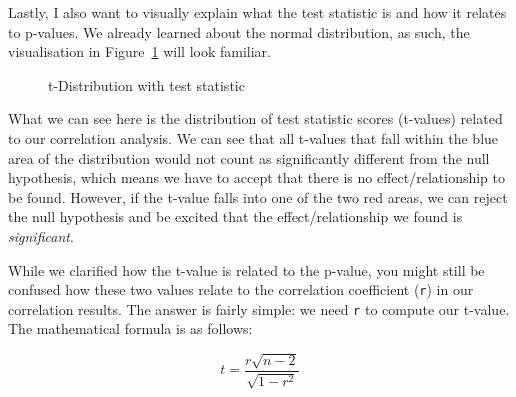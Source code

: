 \documentclass[
  letterpaper,
  DIV=11,
  numbers=noendperiod]{scrreprt}
\begin{document}
Lastly, I also want to visually explain what the test statistic is and
how it relates to p-values. We already learned about the normal
distribution, as such, the visualisation in
Figure~\ref{fig-null-hypothesis-testing-plot} will look familiar.

\begin{figure}


\caption{\label{fig-null-hypothesis-testing-plot}t-Distribution with
test statistic}

\end{figure}%

What we can see here is the distribution of test statistic scores
(t-values) related to our correlation analysis. We can see that all
t-values that fall within the blue area of the distribution would not
count as significantly different from the null hypothesis, which means
we have to accept that there is no effect/relationship to be found.
However, if the t-value falls into one of the two red areas, we can
reject the null hypothesis and be excited that the effect/relationship
we found is \emph{significant}.

While we clarified how the t-value is related to the p-value, you might
still be confused how these two values relate to the correlation
coefficient (\texttt{r}) in our correlation results. The answer is
fairly simple: we need \texttt{r} to compute our t-value. The
mathematical formula is as follows:

\[
t = \frac{r \sqrt{n - 2}}{\sqrt{1 - r^2}}
\]
\end{document}

